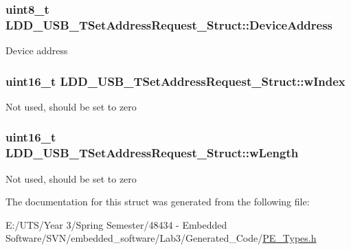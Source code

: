 \subsubsection[{Device\+Address}]{\setlength{\rightskip}{0pt plus 5cm}uint8\+\_\+t L\+D\+D\+\_\+\+U\+S\+B\+\_\+\+T\+Set\+Address\+Request\+\_\+\+Struct\+::\+Device\+Address}\label{struct_l_d_d___u_s_b___t_set_address_request___struct_ac55059f77c050ba97d5f0d9b2b3a52c9}
Device address \hypertarget{struct_l_d_d___u_s_b___t_set_address_request___struct_ab6a26adfbbc2e164679a4d7dcf5c99d0}{}
\subsubsection[{w\+Index}]{\setlength{\rightskip}{0pt plus 5cm}uint16\+\_\+t L\+D\+D\+\_\+\+U\+S\+B\+\_\+\+T\+Set\+Address\+Request\+\_\+\+Struct\+::w\+Index}\label{struct_l_d_d___u_s_b___t_set_address_request___struct_ab6a26adfbbc2e164679a4d7dcf5c99d0}
Not used, should be set to zero \hypertarget{struct_l_d_d___u_s_b___t_set_address_request___struct_adff24e6d3ec27fce1f59693aa215deda}{}
\subsubsection[{w\+Length}]{\setlength{\rightskip}{0pt plus 5cm}uint16\+\_\+t L\+D\+D\+\_\+\+U\+S\+B\+\_\+\+T\+Set\+Address\+Request\+\_\+\+Struct\+::w\+Length}\label{struct_l_d_d___u_s_b___t_set_address_request___struct_adff24e6d3ec27fce1f59693aa215deda}
Not used, should be set to zero 

The documentation for this struct was generated from the following file\+:\begin{DoxyCompactItemize}
\item 
E\+:/\+U\+T\+S/\+Year 3/\+Spring Semester/48434 -\/ Embedded Software/\+S\+V\+N/embedded\+\_\+software/\+Lab3/\+Generated\+\_\+\+Code/\hyperlink{_p_e___types_8h}{P\+E\+\_\+\+Types.\+h}\end{DoxyCompactItemize}
